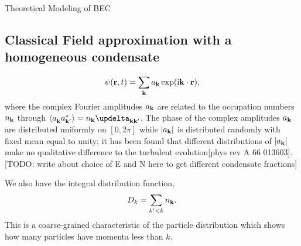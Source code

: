 \begin{chapter}{\label{cha:theoretical_model}Theoretical Modeling of BEC}
	\subsection{\label{section:cfield} Classical Field approximation with a homogeneous condensate}
		\begin{equation}
		\psi({\bf r},t) = \sum_{\bf k} a_{\bf k} \exp (\mathrm{i}{\bf k}\cdot{\bf r}),
		\label{eq:cFieldIC}
		\end{equation}
		where the complex Fourier amplitudes $a_{\bf k}$ are related to the occupation numbers $n_{\bf k}$ through $\braket{a_{\bf k}^{\,}a_{\bf k'}^*} = n_{\bf k}\updelta_{\bf kk'}$. The phase of the complex amplitudes $a_{\bf k}$ are distributed uniformly on $[0,2\pi]$ while $|a_{\bf k}|$ is distributed randomly with fixed mean equal to unity; it has been found that different distributions of $|a_{\bf k}|$ make no qualitative difference to the turbulent evolution[phys rev A 66 013603]. [TODO: write about choice of E and N here to get different condensate fractions]

		We also have the integral distribution function,
		\begin{equation}
		D_k = \sum_{k'<k}n_{\bf k}.
		\label{eq:intDistFunc}
		\end{equation}
		This is a coarse-grained characteristic of the particle distribution which shows how many particles have momenta less than $k$.
\end{chapter}
